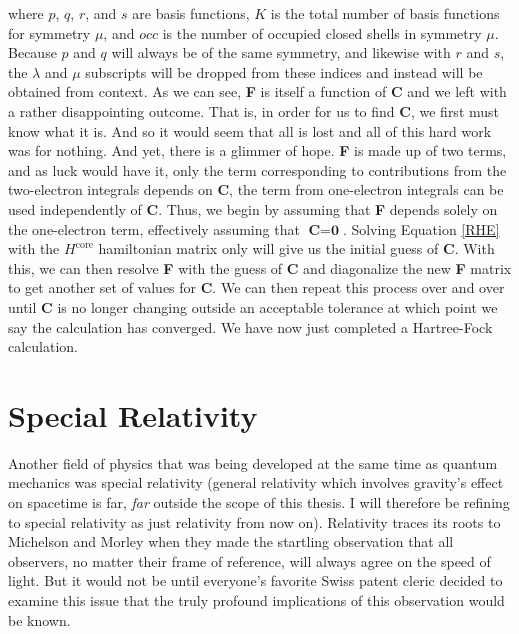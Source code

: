where $p$, $q$, $r$, and $s$ are basis functions, $K$ is the total number of basis functions for symmetry $\mu$, and $occ$ is the number of occupied closed shells in symmetry $\mu$. Because $p$ and $q$ will always be of the same symmetry, and likewise with $r$ and $s$, the $\lambda$ and $\mu$ subscripts will be dropped from these indices and instead will be obtained from context. As we can see, \textbf{F} is itself a function of \textbf{C} and we left with a rather disappointing outcome. That is, in order for us to find \textbf{C}, we first must know what it is. And so it would seem that all is lost and all of this hard work was for nothing. And yet, there is a glimmer of hope. \textbf{F} is made up of two terms, and as luck would have it, only the term corresponding to contributions from the two-electron integrals depends on \textbf{C}, the term from one-electron integrals can be used independently of \textbf{C}. Thus, we begin by assuming that \textbf{F} depends solely on the one-electron term, effectively assuming that $\textbf{C}=\textbf{0}$. Solving Equation \ref{RHE} with the $H^{\text{core}}$ hamiltonian matrix only will give us the initial guess of \textbf{C}. With this, we can then resolve \textbf{F} with the guess of \textbf{C} and diagonalize the new \textbf{F} matrix to get another set of values for \textbf{C}. We can then repeat this process over and over until \textbf{C} is no longer changing outside an acceptable tolerance at which point we say the calculation has converged. We have now just completed a Hartree-Fock calculation.

\section{Special Relativity}
Another field of physics that was being developed at the same time as quantum mechanics was special relativity (general relativity which involves gravity's effect on spacetime is far, \textit{far} outside the scope of this thesis. I will therefore be refining to special relativity as just relativity from now on). Relativity traces its roots to Michelson and Morley\cite{Michelson} when they made the startling observation that all observers, no matter their frame of reference, will always agree on the speed of light. But it would not be until everyone's favorite Swiss patent cleric decided to examine this issue that the truly profound implications of this observation would be known. 

